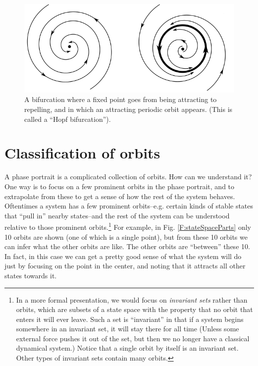 \begin{figure}[h]
\centering
\includegraphics[scale=.5]{./images/bifurcation.png}
\caption[Scott Hotton.]{A bifurcation where a fixed point goes from being 
attracting to repelling, and in which an attracting periodic orbit appears. 
(This is called a ``Hopf bifurcation''). }
\label{F:bifurcation}
\end{figure}

\section{Classification of orbits}


A phase portrait is a complicated collection of orbits. How can we understand it?  One way is to focus on a few prominent orbits in the phase portrait, and to extrapolate from these to get a sense of how the rest of the system behaves. Oftentimes a system has a few prominent orbits--e.g. certain kinds of stable states that ``pull in'' nearby states--and the rest of the system can be understood relative to those prominent orbits.\footnote{In a more formal presentation, we would focus on  \emph{invariant sets} rather than orbits, which are subsets of a state space with the property that no orbit that enters it will ever leave. Such a set is ``invariant'' in that if a system begins somewhere in an invariant set, it will stay there for all time (Unless some external force pushes it out of the set, but then we no longer have a classical dynamical system.) Notice that a single orbit by itself is an invariant set. Other types of invariant sets contain many orbits.}  For example, in Fig. \ref{F:stateSpaceParts} only 10 orbits are shown (one of which is a single point), but from these 10 orbits we can infer what the other orbits are like. The other orbits are ``between'' these 10. In fact, in this case we can get a pretty good sense of what the system will do just by focusing on the point in the center, and noting that it attracts all other states towards it.

